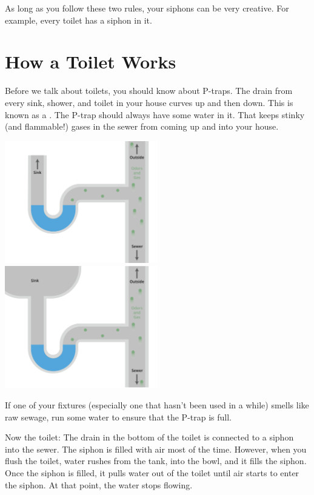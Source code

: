 As long as you follow these two rules,  your siphons can be very creative.  For example,  every toilet has a siphon in it.

\section{How a Toilet Works}

Before we talk about toilets,  you should know about P-traps.  The drain from every sink, shower, 
and toilet in your house curves up and then down.  This is known as a .   
The P-trap should always have some water in it.  That keeps stinky (and flammable!) gases 
in the sewer from coming up and into your house.  

\includegraphics[width=0.5\textwidth]{ptrap1.png}
\includegraphics[width=0.5\textwidth]{ptrap1b.png}


If one of your fixtures (especially one that hasn't been used in a while) smells like raw sewage,  run
some water to ensure that the P-trap is full.

Now the toilet:  The drain in the bottom of the toilet is connected to a siphon into the sewer.   The siphon is filled with air most of the time.  However, when you flush the toilet,  water rushes from the tank, into the bowl,  and it fills the siphon.  Once the siphon is filled,  it pulls water out of the toilet until air starts to enter the siphon.  At that point,  the water stops flowing.

